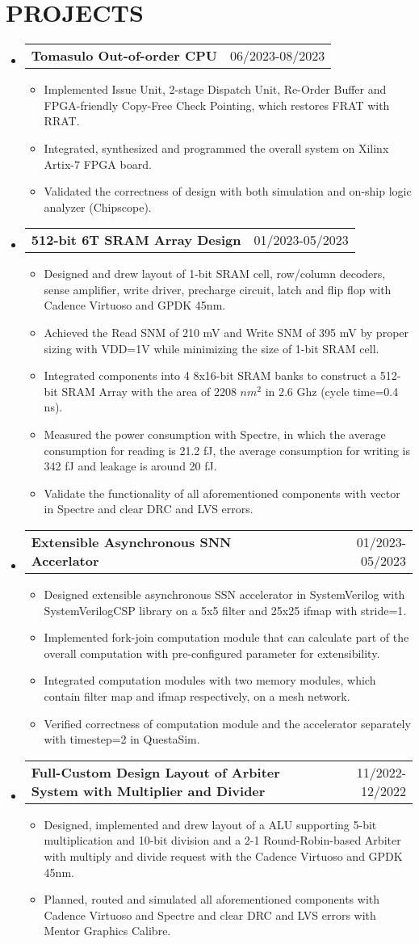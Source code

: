 \documentclass[letterpaper,11pt]{article}
\makeatletter
\newcommand{\resumeItemOne}[1]{
  \item\small{#1}
}
\newcommand{\resumeSubheadingNoTitle}[2]{
  \vspace{-1pt}\item
    \begin{tabular*}{0.97\textwidth}[t]{l@{\extracolsep{\fill}}r}
      \textbf{#1} & #2 %
    \end{tabular*}\vspace{-5pt}
}
\newcommand{\resumeSubHeadingListStart}{\begin{itemize}[leftmargin=*]}
\newcommand{\resumeSubHeadingListEnd}{\end{itemize}\vspace{-5pt}}
\newcommand{\resumeItemListStart}{\begin{itemize}}
\newcommand{\resumeItemListEnd}{\end{itemize}\vspace{-10pt}}
\makeatother
\begin{document}
\section{PROJECTS}
\resumeSubHeadingListStart
\resumeSubheadingNoTitle
    {Tomasulo Out-of-order CPU}{06/2023-08/2023}
\resumeItemListStart
	\resumeItemOne{Implemented Issue Unit, 2-stage Dispatch Unit, Re-Order Buffer and FPGA-friendly Copy-Free Check Pointing, which restores FRAT with RRAT.}
	\resumeItemOne{Integrated, synthesized and programmed the overall system on Xilinx Artix-7 FPGA board.}
	\resumeItemOne{Validated the correctness of design with both simulation and on-ship logic analyzer (Chipscope).}
\resumeItemListEnd
\resumeSubheadingNoTitle
    {512-bit 6T SRAM Array Design}{01/2023-05/2023}
\resumeItemListStart
	\resumeItemOne{Designed and drew layout of 1-bit SRAM cell, row/column decoders, sense amplifier, write driver, precharge circuit, latch and flip flop with Cadence Virtuoso and GPDK 45nm.}
	\resumeItemOne{Achieved the Read SNM of 210 mV and Write SNM of 395 mV by proper sizing with VDD=1V while minimizing the size of 1-bit SRAM cell.}
	\resumeItemOne{Integrated components into 4 8x16-bit SRAM banks to construct a 512-bit SRAM Array with the area of 2208 $nm^2$ in 2.6 Ghz (cycle time=0.4 ns).}
	\resumeItemOne{Measured the power consumption with Spectre, in which the average consumption for reading is 21.2 fJ, the average consumption for writing is 342 fJ and leakage is around 20 fJ.}
	\resumeItemOne{Validate the functionality of all aforementioned components with vector in Spectre and clear DRC and LVS errors.}
\resumeItemListEnd
\resumeSubheadingNoTitle
    {Extensible Asynchronous SNN Accerlator}{01/2023-05/2023}
\resumeItemListStart
	\resumeItemOne{Designed extensible asynchronous SSN accelerator in SystemVerilog with SystemVerilogCSP library on a 5x5 filter and 25x25 ifmap with stride=1.}
	\resumeItemOne{Implemented fork-join computation module that can calculate part of the overall computation with pre-configured parameter for extensibility.}
	\resumeItemOne{Integrated computation modules with two memory modules, which contain filter map and ifmap respectively, on a mesh network.}
	\resumeItemOne{Verified correctness of computation module and the accelerator separately with timestep=2 in QuestaSim.}
\resumeItemListEnd
\resumeSubheadingNoTitle
    {Full-Custom Design Layout of Arbiter System with Multiplier and Divider}{11/2022-12/2022}
\resumeItemListStart
	\resumeItemOne{Designed, implemented and drew layout of a ALU supporting 5-bit multiplication and 10-bit division and a 2-1 Round-Robin-based Arbiter with multiply and divide request with the Cadence Virtuoso and GPDK 45nm.}
	\resumeItemOne{Planned, routed and simulated all aforementioned components with Cadence Virtuoso and Spectre and clear DRC and LVS errors with Mentor Graphics Calibre.}
\resumeItemListEnd
\resumeSubHeadingListEnd
\end{document}
